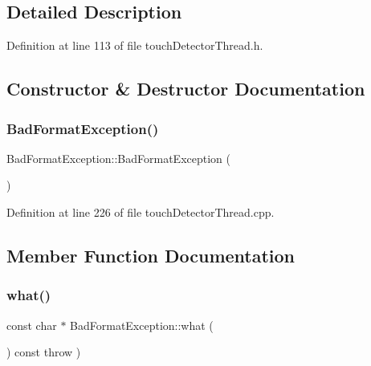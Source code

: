 \subsection{Detailed Description}


Definition at line 113 of file touch\+Detector\+Thread.\+h.



\subsection{Constructor \& Destructor Documentation}
\mbox{\label{classBadFormatException_a62651b0b36083b83c2976109b4741a24}} 
\subsubsection{\texorpdfstring{Bad\+Format\+Exception()}{BadFormatException()}}
{\footnotesize\ttfamily Bad\+Format\+Exception\+::\+Bad\+Format\+Exception (\begin{DoxyParamCaption}{ }\end{DoxyParamCaption})}



Definition at line 226 of file touch\+Detector\+Thread.\+cpp.



\subsection{Member Function Documentation}
\mbox{\label{classBadFormatException_aeec1c6ac4cbdf5a8623d566efb5d3077}} 
\subsubsection{\texorpdfstring{what()}{what()}}
{\footnotesize\ttfamily const char $\ast$ Bad\+Format\+Exception\+::what (\begin{DoxyParamCaption}{ }\end{DoxyParamCaption}) const throw  ) \hspace{0.3cm}{\ttfamily [virtual]}}



